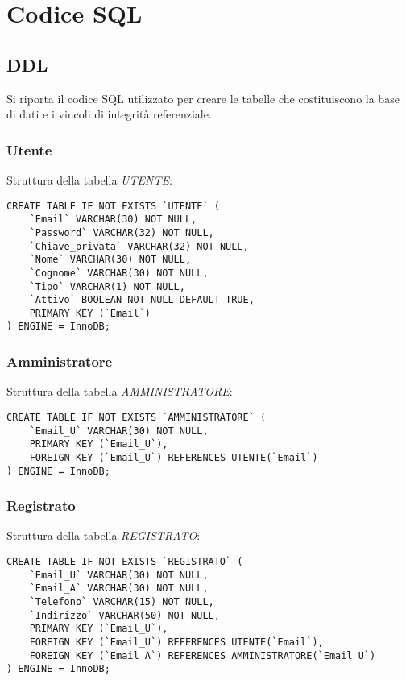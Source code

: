 
\chapter{Codice SQL}
\label{cap:codice-sql}

\section{DDL}
Si riporta il codice SQL utilizzato per creare le tabelle che costituiscono la base di dati e i vincoli di integrità referenziale.

\subsection{Utente}
Struttura della tabella \emph{UTENTE}:

\begin{lstlisting}
CREATE TABLE IF NOT EXISTS `UTENTE` (
	`Email` VARCHAR(30) NOT NULL,
	`Password` VARCHAR(32) NOT NULL,
	`Chiave_privata` VARCHAR(32) NOT NULL,
	`Nome` VARCHAR(30) NOT NULL,
	`Cognome` VARCHAR(30) NOT NULL,
	`Tipo` VARCHAR(1) NOT NULL,
	`Attivo` BOOLEAN NOT NULL DEFAULT TRUE,
	PRIMARY KEY (`Email`)
) ENGINE = InnoDB;
\end{lstlisting}

\subsection{Amministratore}
Struttura della tabella \emph{AMMINISTRATORE}:

\begin{lstlisting}
CREATE TABLE IF NOT EXISTS `AMMINISTRATORE` (
	`Email_U` VARCHAR(30) NOT NULL,
	PRIMARY KEY (`Email_U`),
	FOREIGN KEY (`Email_U`) REFERENCES UTENTE(`Email`)
) ENGINE = InnoDB;
\end{lstlisting}

\newpage

\subsection{Registrato}
Struttura della tabella \emph{REGISTRATO}:

\begin{lstlisting}
CREATE TABLE IF NOT EXISTS `REGISTRATO` (
	`Email_U` VARCHAR(30) NOT NULL,
	`Email_A` VARCHAR(30) NOT NULL,
	`Telefono` VARCHAR(15) NOT NULL,
	`Indirizzo` VARCHAR(50) NOT NULL,
	PRIMARY KEY (`Email_U`),
	FOREIGN KEY (`Email_U`) REFERENCES UTENTE(`Email`),
	FOREIGN KEY (`Email_A`) REFERENCES AMMINISTRATORE(`Email_U`)
) ENGINE = InnoDB;
\end{lstlisting}

